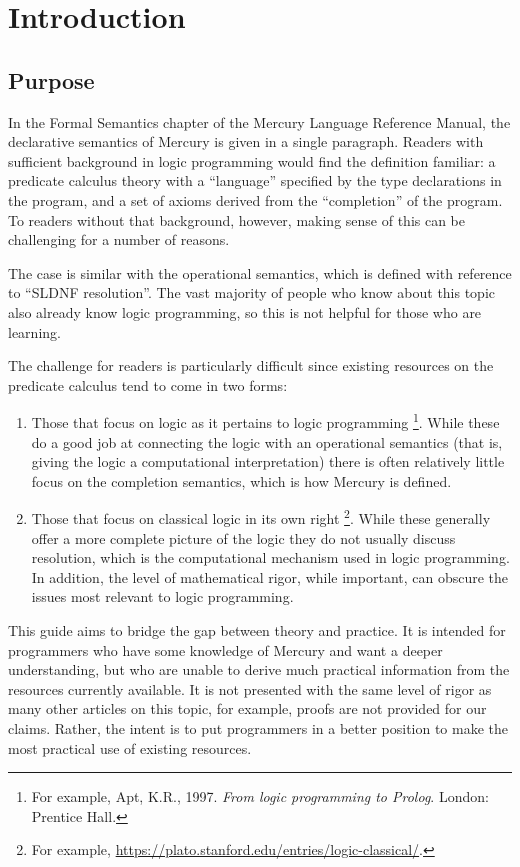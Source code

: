 \chapter{Introduction}
\label{sec:intro}

\section{Purpose}
\label{sec:purpose}

In the Formal Semantics chapter of the Mercury Language Reference Manual,
the declarative semantics of Mercury is given in a single paragraph.
Readers with sufficient background in logic programming
would find the definition familiar:
a predicate calculus theory
with a ``language'' specified by the type declarations in the program,
and a set of axioms derived from the ``completion'' of the program.
To readers without that background, however,
making sense of this can be challenging
for a number of reasons.

The case is similar with the operational semantics,
which is defined with reference to ``SLDNF resolution''.
The vast majority of people who know about this topic
also already know logic programming,
so this is not helpful for those who are learning.

The challenge for readers is particularly difficult
since existing resources on the predicate calculus
tend to come in two forms:
\begin{enumerate}
\item
Those that focus on logic as it pertains to logic programming%
\footnote{
For example,
Apt, K.R., 1997. \textit{From logic programming to Prolog}.
London: Prentice Hall.
}.
While these do a good job at connecting the logic
with an operational semantics
(that is, giving the logic a computational interpretation)
there is often relatively little focus on the completion semantics,
which is how Mercury is defined.
\item
Those that focus on classical logic in its own right%
\footnote{
For example,
\href{https://plato.stanford.edu/entries/logic-classical/}
{https://plato.stanford.edu/entries/logic-classical/}.
}.
While these generally offer a more complete picture of the logic
they do not usually discuss resolution,
which is the computational mechanism used in logic programming.
In addition, the level of mathematical rigor, while important,
can obscure the issues most relevant to logic programming.
\end{enumerate}
This guide aims to bridge the gap between theory and practice.
It is intended for programmers who have some knowledge of Mercury
and want a deeper understanding,
but who are unable to derive much practical information
from the resources currently available.
It is not presented with the same level of rigor
as many other articles on this topic,
for example, proofs are not provided for our claims.
Rather, the intent is to put programmers in a better position
to make the most practical use of existing resources.

